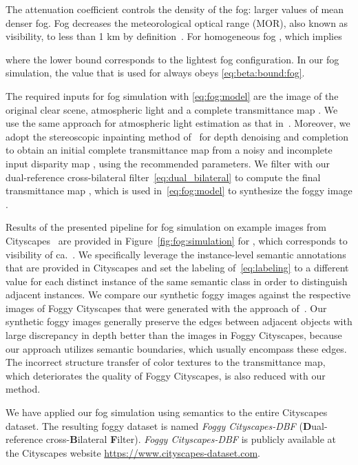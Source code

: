 \documentclass[twocolumn]{svjour3}          \smartqed  \usepackage{graphicx}
\begin{document}
The attenuation coefficient  controls the density of the fog: larger values of  mean denser fog. Fog decreases the meteorological optical range (MOR), also known as visibility, to less than 1 km by definition~\cite{Federal:meteorological:handbook}. For homogeneous fog , which implies

where the lower bound corresponds to the lightest fog configuration. In our fog simulation, the value that is used for  always obeys \eqref{eq:beta:bound:fog}.

The required inputs for fog simulation with \eqref{eq:fog:model} are the image  of the original clear scene, atmospheric light  and a complete transmittance map . We use the same approach for atmospheric light estimation as that in~\cite{SFSU_synthetic}. Moreover, we adopt the stereoscopic inpainting method of~\cite{SFSU_synthetic} for depth denoising and completion to obtain an initial complete transmittance map  from a noisy and incomplete input disparity map , using the recommended parameters. We filter  with our dual-reference cross-bilateral filter~\eqref{eq:dual_bilateral} to compute the final transmittance map , which is used in~\eqref{eq:fog:model} to synthesize the foggy image .

Results of the presented pipeline for fog simulation on example images from Cityscapes~\cite{Cityscapes} are provided in Figure~\ref{fig:fog:simulation} for , which corresponds to visibility of ca.\ . We specifically leverage the instance-level semantic annotations that are provided in Cityscapes and set the labeling  of~\eqref{eq:labeling} to a different value for each distinct instance of the same semantic class in order to distinguish adjacent instances. We compare our synthetic foggy images against the respective images of Foggy Cityscapes that were generated with the approach of~\cite{SFSU_synthetic}. Our synthetic foggy images generally preserve the edges between adjacent objects with large discrepancy in depth better than the images in Foggy Cityscapes, because our approach utilizes semantic boundaries, which usually encompass these edges. The incorrect structure transfer of color textures to the transmittance map, which deteriorates the quality of Foggy Cityscapes, is also reduced with our method. 

We have applied our fog simulation using semantics to the entire Cityscapes dataset. The resulting foggy dataset is named \emph{Foggy Cityscapes-DBF} (\textbf{D}ual-reference cross-\textbf{B}ilateral \textbf{F}ilter). \emph{Foggy Cityscapes-DBF} is publicly available at the Cityscapes website \url{https://www.cityscapes-dataset.com}.
\end{document}
